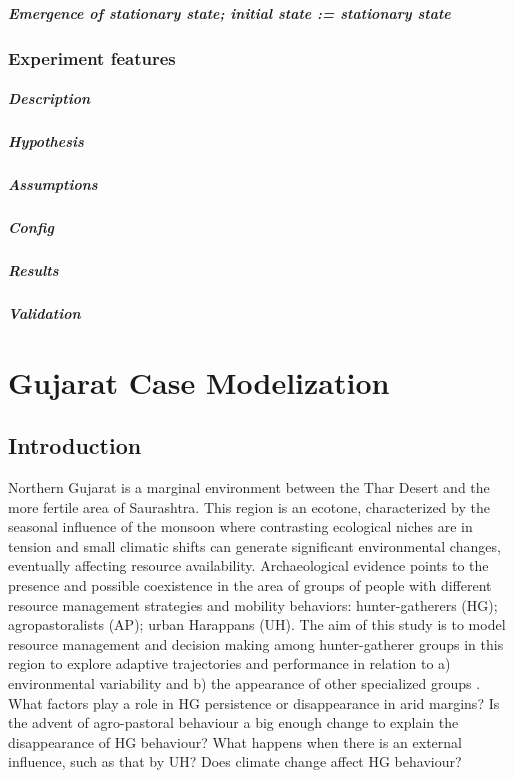 \documentclass{report}
\begin{document}
\begin{enumeration}
\begin{end}
			\paragraph{Emergence of stationary state; initial state := stationary state}
		\subsection{Experiment features}
			\paragraph{Description}
			\paragraph{Hypothesis}
			\paragraph{Assumptions}
			\paragraph{Config}
			\paragraph{Results}
			\paragraph{Validation}

\newpage 
\chapter{Gujarat Case Modelization} %
	\section{Introduction}
Northern Gujarat is a marginal environment between the Thar Desert and the more fertile area of Saurashtra. This region is an ecotone, characterized by the seasonal influence of the monsoon where contrasting ecological niches are in tension and small climatic shifts can generate significant environmental changes, eventually affecting  resource availability. Archaeological evidence points to the presence and possible coexistence in the area of groups of people with different resource management strategies and mobility behaviors: hunter-gatherers (HG); agropastoralists (AP); urban Harappans (UH).
The aim of this study is to model resource management and decision making among hunter-gatherer groups in this region to explore adaptive trajectories and performance in relation to a) environmental variability and b) the appearance of other specialized groups . 
What factors play a role in HG persistence or disappearance in arid margins? Is the advent of agro-pastoral behaviour a big enough change to explain the disappearance of HG behaviour? What happens when there is an external influence, such as that by UH? Does climate change affect HG behaviour?

\end{end}
\end{enumeration}
\end{document}
